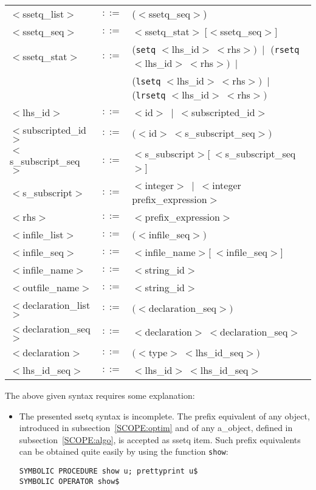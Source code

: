 {\begin{center}
\begin{tabular}{lcl}
$<$ssetq\_list$>$ & $::=$ & ($<$ssetq\_seq$>$)\\
$<$ssetq\_seq$>$ & $::=$ & $<$ssetq\_stat$>~[<$ssetq\_seq$>]$\\
$<$ssetq\_stat$>$ & $::=$ & ({\tt setq} $<$lhs\_id$>~<$rhs$>)~\mid$
({\tt rsetq} $<$lhs\_id$>~<$rhs$>)~\mid$\\
 & & ({\tt lsetq} $<$lhs\_id$>~<$rhs$>)~\mid$
({\tt lrsetq} $<$lhs\_id$>~<$rhs$>)$\\
$<$lhs\_id$>$ & $::=$ & $<$id$>~\mid~<$subscripted\_id$>$\\
$<$subscripted\_id$>$ & $::=$ & $(<$id$>~<$s\_subscript\_seq$>)$\\
$<$s\_subscript\_seq$>$ & $::=$ & $<$s\_subscript$>[~<$s\_subscript\_seq$>$]\\
$<$s\_subscript$>$ & $::=$ & $<$integer$>~\mid~<$integer prefix\_expression$>$\\
$<$rhs$>$ & $::=$ & $<$prefix\_expression$>$\\
$<$infile\_list$>$ & $::=$ & $(<$infile\_seq$>)$\\
$<$infile\_seq$>$ & $::=$ & $<$infile\_name$>[~<$infile\_seq$>]$\\
$<$infile\_name$>$ & $::=$ & $<$string\_id$>$\\
$<$outfile\_name$>$ & $::=$ & $<$string\_id$>$\\
$<$declaration\_list$>$ & $::=$ & $(<$declaration\_seq$>)$\\
$<$declaration\_seq$>$ & $::=$ & $<$declaration$>~<$declaration\_seq$>$\\
$<$declaration$>$ & $::=$ & $(<$type$>~<$lhs\_id\_seq$>)$\\
$<$lhs\_id\_seq$>$ & $::=$ & $<$lhs\_id$>~<$lhs\_id\_seq$>$
\end{tabular}
\end{center}

The above given syntax requires some explanation:
\begin{itemize}
\item The presented ssetq syntax is incomplete. The prefix equivalent of 
any object, introduced in subsection~\ref{SCOPE:optim} and of any a\_object,
defined in subsection~\ref{SCOPE:algo}, is accepted as ssetq item. Such prefix
equivalents can be obtained quite easily by using the function {\tt show}:

\hspace*{1cm} {\tt SYMBOLIC PROCEDURE show u; prettyprint u}\verb+$+ \\
\hspace*{1cm} {\tt SYMBOLIC OPERATOR show}\verb+$+


\end{itemize}}
